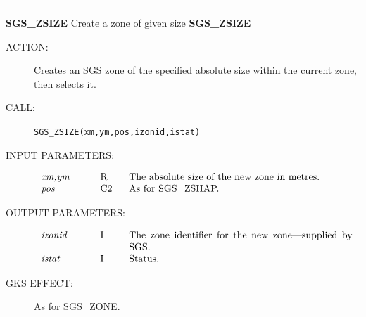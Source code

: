 \documentclass[11pt]{article}
\newcommand{\htmlref}[2]{#1}
\newcommand{\xlabel}[1]{}
\newcommand{\rthead}[2]{\rule{\textwidth}{0.3mm}
{\Large {\bf #1} \hfill #2 \hfill {\bf #1}}}
\newenvironment{params}%
{\[\begin{tabular}{p{0.14\textwidth}p{0.05\textwidth}p{0.66\textwidth}}}%
{\end{tabular}\]}
\newcommand{\rparams}[3]{{\em #1} &#2 &#3\\}
\newcommand{\rthead}[2]{\subsection{\label{#1}\xlabel{#1}#1 - #2}}
\newenvironment{params}{\begin{description}}{\end{description}}
\newcommand{\rparams}[3]{\item{{\em #1}} (#2) #3}
\begin{document}
\rthead{SGS\_ZSIZE}{Create a zone of given size}
\begin{description}
\item [ACTION:]
Creates an SGS zone of the specified absolute size within the current zone,
then selects it.
\item [CALL:]
{\tt SGS\_ZSIZE(xm,ym,pos,izonid,istat)}
\item [INPUT PARAMETERS:]
\begin{params}
\rparams{xm,ym}{R}{The absolute size of the new zone in metres.}
\rparams{pos}{C2}{As for \htmlref{SGS\_ZSHAP}{SGS_ZSHAP}.}
\end{params}
\item [OUTPUT PARAMETERS:]
\begin{params}
\rparams{izonid}{I}{The zone identifier for the new zone---supplied by SGS.}
\rparams{istat}{I}{Status.}
\end{params}
\item [GKS EFFECT:]
As for \htmlref{SGS\_ZONE}{SGS_ZONE}.
\end{description}
\end{document}
